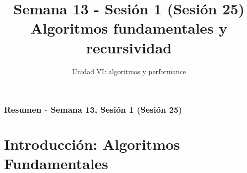 \documentclass[10pt]{beamer}
\title[Semana 13 - P1]{Semana 13 - Sesión 1 (Sesión 25)\\Algoritmos fundamentales y recursividad}
\subtitle{Unidad VI: algoritmos y performance}
\begin{document}
\myfront{}

\begin{frame}
  \titlepage
\end{frame}

\begin{frame}
  \frametitle{Resumen - Semana 13, Sesión 1 (Sesión 25)}
  \tableofcontents
\end{frame}


\section{Introducción: Algoritmos Fundamentales}
\end{document}
